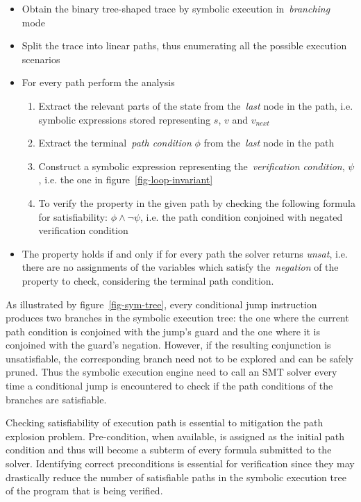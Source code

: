 \begin{itemize}
  \item Obtain the binary tree-shaped trace by symbolic execution in~\emph{branching} mode
  \item Split the trace into linear paths, thus enumerating all the possible
    execution scenarios
  \item For every path perform the analysis
    \begin{enumerate}
      \item Extract the relevant parts of the state from the~\emph{last} node in
        the path, i.e. symbolic expressions stored representing $s$,
        $v$ and $v_{next}$
      \item Extract the terminal~\emph{path condition} $\phi$
            from the~\emph{last} node in the path
      \item Construct a symbolic expression representing the~\emph{verification condition},
            $\psi$, i.e. the one in figure~\ref{fig-loop-invariant}
      \item To verify the property in the given path by checking the following
        formula for satisfiability: $\phi \land \lnot\psi$, i.e. the path condition
        conjoined with negated verification condition

    \end{enumerate}
    \item  The property holds if and only if for every path the solver returns
           \emph{unsat}, i.e. there are no assignments of the variables which
           satisfy the~\emph{negation} of the property to check, considering the
           terminal path condition.
\end{itemize}

As illustrated by figure~\ref{fig-sym-tree}, every conditional jump instruction produces
two branches in the symbolic execution tree: the one
where the current path condition is conjoined with the jump's guard and the one where it is
conjoined with the guard's negation. However, if the resulting
conjunction is unsatisfiable, the corresponding branch need not to be explored
and can be safely pruned.
Thus the symbolic execution engine need to call an SMT solver every
time a conditional jump is encountered to check if the path conditions of the branches
are satisfiable.

Checking satisfiability of execution path is essential to mitigation the path explosion
problem. Pre-condition, when available, is assigned as the initial path condition and thus
will become a subterm of every formula submitted to the solver.
Identifying correct preconditions is essential for verification since they may
drastically reduce the number of satisfiable paths in the symbolic execution tree
of the program that is being verified.
